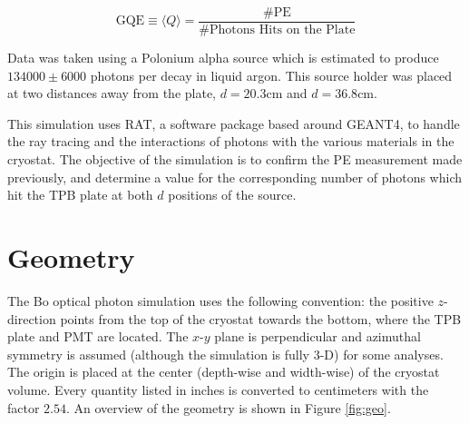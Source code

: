 \documentclass[aps,pra,notitlepage,groupedaddress]{revtex4-1}
\begin{document}
\begin{equation}\label{eq:gqe}
\text{GQE} \equiv \langle Q \rangle = \frac{\text{\# PE}}{\text{\# Photons Hits on the Plate}}
\end{equation}

Data was taken using a Polonium alpha source which is estimated to produce $134000 \pm 6000$ photons per decay in liquid argon. This source holder was placed at two distances away from the plate, $d=20.3$cm and $d=36.8$cm.

This simulation uses RAT, a software package based around GEANT4, to handle the ray tracing and the interactions of photons with the various materials in the cryostat. The objective of the simulation is to confirm the PE measurement made previously, and determine a value for the corresponding number of photons which hit the TPB plate at both $d$ positions of the source.


\section{Geometry}

The Bo optical photon simulation uses the following convention: the positive $z$-direction points from the top of the cryostat towards the bottom, where the TPB plate and PMT are located. The $x$-$y$ plane is perpendicular and azimuthal symmetry is assumed (although the simulation is fully 3-D) for some analyses. The origin is placed at the center (depth-wise and width-wise) of the cryostat volume. Every quantity listed in inches is converted to centimeters with the factor $2.54$. An overview of the geometry is shown in Figure \ref{fig:geo}.
\end{document}
